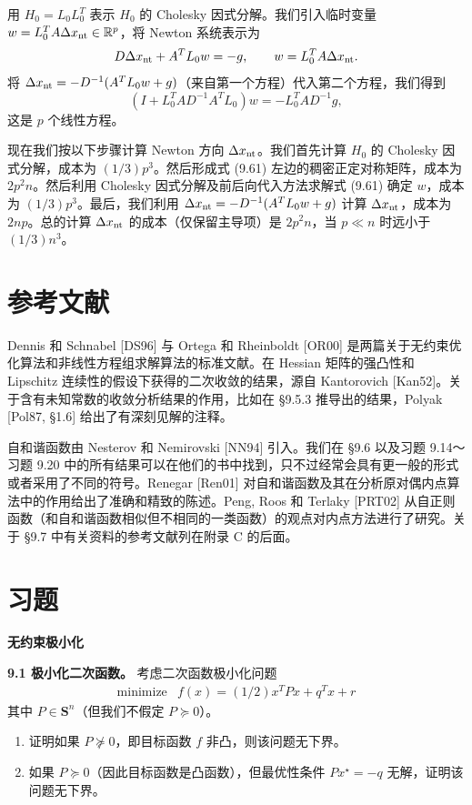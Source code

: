 \documentclass[UTF8,12pt,a4paper,fontset=fandol]{ctexart}
\begin{document}
用 $H_0=L_0L_0^T$ 表示 $H_0$ 的 Cholesky 因式分解。我们引入临时变量 $w=L_0^TA\Delta x_{\rm nt}\in\mathbb{R}^p$，将 Newton 系统表示为
\[
D\Delta x_{\rm nt}+A^TL_0w=-g,\qquad w=L_0^TA\Delta x_{\rm nt}.
\]
将 $\Delta x_{\rm nt}=-D^{-1}(A^TL_0w+g)$（来自第一个方程）代入第二个方程，我们得到
\begin{equation}
(I+L_0^TAD^{-1}A^TL_0)w=-L_0^TAD^{-1}g,
\tag{9.61}
\end{equation}
这是 $p$ 个线性方程。

现在我们按以下步骤计算 Newton 方向 $\Delta x_{\rm nt}$。我们首先计算 $H_0$ 的 Cholesky 因式分解，成本为 $(1/3)p^3$。然后形成式 (9.61) 左边的稠密正定对称矩阵，成本为 $2p^2n$。然后利用 Cholesky 因式分解及前后向代入方法求解式 (9.61) 确定 $w$，成本为 $(1/3)p^3$。最后，我们利用 $\Delta x_{\rm nt}=-D^{-1}(A^TL_0w+g)$ 计算 $\Delta x_{\rm nt}$，成本为 $2np$。总的计算 $\Delta x_{\rm nt}$ 的成本（仅保留主导项）是 $2p^2n$，当 $p\ll n$ 时远小于 $(1/3)n^3$。

\section*{参考文献}

Dennis 和 Schnabel [DS96] 与 Ortega 和 Rheinboldt [OR00] 是两篇关于无约束优化算法和非线性方程组求解算法的标准文献。在 Hessian 矩阵的强凸性和 Lipschitz 连续性的假设下获得的二次收敛的结果，源自 Kantorovich [Kan52]。关于含有未知常数的收敛分析结果的作用，比如在 \S9.5.3 推导出的结果，Polyak [Pol87, \S1.6] 给出了有深刻见解的注释。

自和谐函数由 Nesterov 和 Nemirovski [NN94] 引入。我们在 \S9.6 以及习题 9.14～习题 9.20 中的所有结果可以在他们的书中找到，只不过经常会具有更一般的形式或者采用了不同的符号。Renegar [Ren01] 对自和谐函数及其在分析原对偶内点算法中的作用给出了准确和精致的陈述。Peng, Roos 和 Terlaky [PRT02] 从自正则函数（和自和谐函数相似但不相同的一类函数）的观点对内点方法进行了研究。关于 \S9.7 中有关资料的参考文献列在附录 C 的后面。

\section*{习题}

\noindent\textbf{无约束极小化}

\noindent\textbf{9.1 极小化二次函数。}\quad
考虑二次函数极小化问题
\[
\begin{array}{ll}
\mbox{minimize} & f(x)=(1/2)x^TPx+q^Tx+r
\end{array}
\]
其中 $P\in\mathbf{S}^n$（但我们不假定 $P\succeq0$）。
\begin{enumerate}
\item[(a)] 证明如果 $P\nsucceq0$，即目标函数 $f$ 非凸，则该问题无下界。
\item[(b)] 如果 $P\succeq0$（因此目标函数是凸函数），但最优性条件 $Px^\star=-q$ 无解，证明该问题无下界。
\end{enumerate}
\end{document}
